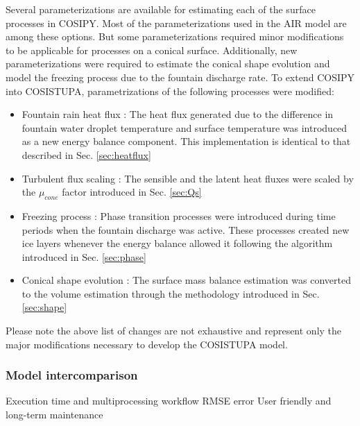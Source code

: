 Several parameterizations are available for estimating each of the surface processes in COSIPY. Most of the
parameterizations used in the AIR model are among these options. But some parameterizations required minor
modifications to be applicable for processes on a conical surface. Additionally, new parameterizations were
required to estimate the conical shape evolution and model the freezing process due to the fountain discharge
rate. To extend COSIPY into COSISTUPA, parametrizations of the following processes were modified:

\begin{itemize}

  \item Fountain rain heat flux : The heat flux generated due to the difference in fountain water droplet
    temperature and surface temperature was introduced as a new energy balance component. This implementation is
    identical to that described in Sec. \ref{sec:heatflux}

  \item Turbulent flux scaling : The sensible and the latent heat fluxes were scaled by the $\mu_{cone}$ factor
    introduced in Sec. \ref{sec:Qs}

  \item Freezing process : Phase transition processes were introduced during time periods when the fountain
    discharge was active. These processes created new ice layers whenever the energy balance allowed it
    following the algorithm introduced in Sec. \ref{sec:phase}

  \item Conical shape evolution : The surface mass balance estimation was converted to the volume estimation
    through the methodology introduced in Sec. \ref{sec:shape}

\end{itemize}

Please note the above list of changes are not exhaustive and represent only the major modifications necessary to
develop the COSISTUPA model.

\subsubsection{Model intercomparison}

Execution time and multiprocessing workflow
RMSE error
User friendly and long-term maintenance


